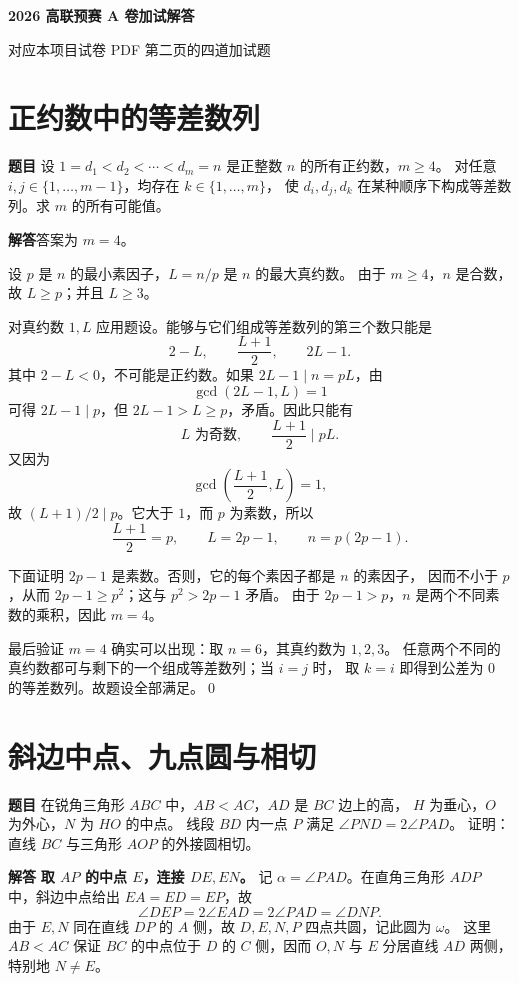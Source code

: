 \documentclass[UTF8,11pt,fontset=fandol]{ctexart}
\numberwithin{equation}{section}
\newcommand{\problem}{\noindent\textbf{题目\quad}}
\newcommand{\solution}{\par\medskip\noindent\textbf{解答\quad}}
\newcommand{\qedmark}{\qed\par}
\begin{document}
\begin{center}
  {\LARGE\bfseries 2026 高联预赛 A 卷加试解答}\par
  \vspace{5pt}
  {\small 对应本项目试卷 PDF 第二页的四道加试题}
\end{center}

\section{正约数中的等差数列}
\problem
设 $1=d_1<d_2<\cdots<d_m=n$ 是正整数 $n$ 的所有正约数，$m\ge4$。
对任意 $i,j\in\{1,\ldots,m-1\}$，均存在 $k\in\{1,\ldots,m\}$，
使 $d_i,d_j,d_k$ 在某种顺序下构成等差数列。求 $m$ 的所有可能值。

\solution 答案为 $\boxed{m=4}$。

设 $p$ 是 $n$ 的最小素因子，$L=n/p$ 是 $n$ 的最大真约数。
由于 $m\ge4$，$n$ 是合数，故 $L\ge p$；并且 $L\ge3$。

对真约数 $1,L$ 应用题设。能够与它们组成等差数列的第三个数只能是
\[
 2-L,\qquad \frac{L+1}{2},\qquad 2L-1.
\]
其中 $2-L<0$，不可能是正约数。如果 $2L-1\mid n=pL$，由
\[
 \gcd(2L-1,L)=1
\]
可得 $2L-1\mid p$，但 $2L-1>L\ge p$，矛盾。因此只能有
\[
 L\text{ 为奇数},\qquad \frac{L+1}{2}\mid pL.
\]
又因为
\[
 \gcd\!\left(\frac{L+1}{2},L\right)=1,
\]
故 $(L+1)/2\mid p$。它大于 $1$，而 $p$ 为素数，所以
\[
 \frac{L+1}{2}=p,\qquad L=2p-1,\qquad n=p(2p-1).
\]

下面证明 $2p-1$ 是素数。否则，它的每个素因子都是 $n$ 的素因子，
因而不小于 $p$，从而 $2p-1\ge p^2$；这与 $p^2>2p-1$ 矛盾。
由于 $2p-1>p$，$n$ 是两个不同素数的乘积，因此 $m=4$。

最后验证 $m=4$ 确实可以出现：取 $n=6$，其真约数为 $1,2,3$。
任意两个不同的真约数都可与剩下的一个组成等差数列；当 $i=j$ 时，
取 $k=i$ 即得到公差为 $0$ 的等差数列。故题设全部满足。\qedmark

\newpage
\section{斜边中点、九点圆与相切}
\problem
在锐角三角形 $ABC$ 中，$AB<AC$，$AD$ 是 $BC$ 边上的高，
$H$ 为垂心，$O$ 为外心，$N$ 为 $HO$ 的中点。
线段 $BD$ 内一点 $P$ 满足 $\angle PND=2\angle PAD$。
证明：直线 $BC$ 与三角形 $AOP$ 的外接圆相切。

\solution
\textbf{取 $AP$ 的中点 $E$，连接 $DE,EN$。}
记 $\alpha=\angle PAD$。在直角三角形 $ADP$ 中，斜边中点给出 $EA=ED=EP$，故
\[
 \angle DEP=2\angle EAD=2\angle PAD=\angle DNP.
\]
由于 $E,N$ 同在直线 $DP$ 的 $A$ 侧，故 $D,E,N,P$ 四点共圆，记此圆为 $\omega$。
这里 $AB<AC$ 保证 $BC$ 的中点位于 $D$ 的 $C$ 侧，因而 $O,N$ 与 $E$
分居直线 $AD$ 两侧，特别地 $N\ne E$。
\end{document}
